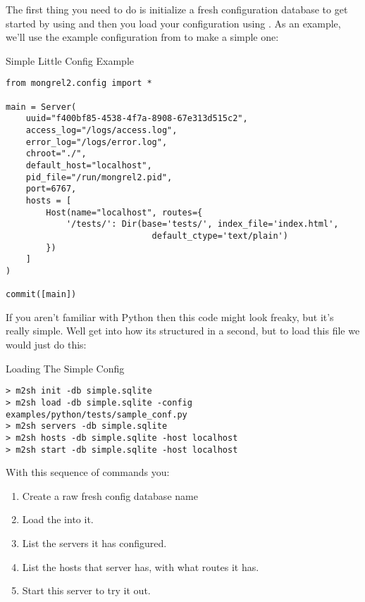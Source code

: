 The first thing you need to do is initialize a fresh configuration database to get
started by using  and then you load your configuration using
.  As an example, we'll use the example configuration
from  to make a simple one:

\begin{code}{Simple Little Config Example}
\begin{verbatim}
from mongrel2.config import *

main = Server(
    uuid="f400bf85-4538-4f7a-8908-67e313d515c2",
    access_log="/logs/access.log",
    error_log="/logs/error.log",
    chroot="./",
    default_host="localhost",
    pid_file="/run/mongrel2.pid",
    port=6767,
    hosts = [
        Host(name="localhost", routes={
            '/tests/': Dir(base='tests/', index_file='index.html',
                             default_ctype='text/plain')
        })
    ]
)

commit([main])
\end{verbatim}
\end{code}

If you aren't familiar with Python then this code might look freaky, but it's really
simple.  Well get into how its structured in a second, but to load this file
we would just do this:

\begin{code}{Loading The Simple Config}
\begin{verbatim}
> m2sh init -db simple.sqlite
> m2sh load -db simple.sqlite -config examples/python/tests/sample_conf.py
> m2sh servers -db simple.sqlite
> m2sh hosts -db simple.sqlite -host localhost
> m2sh start -db simple.sqlite -host localhost
\end{verbatim}
\end{code}

With this sequence of commands you:

\begin{enumerate}
\item Create a raw fresh config database name 
\item Load the  into it.
\item List the servers it has configured.
\item List the hosts that server has, with what routes it has.
\item Start this server to try it out.
\end{enumerate}

